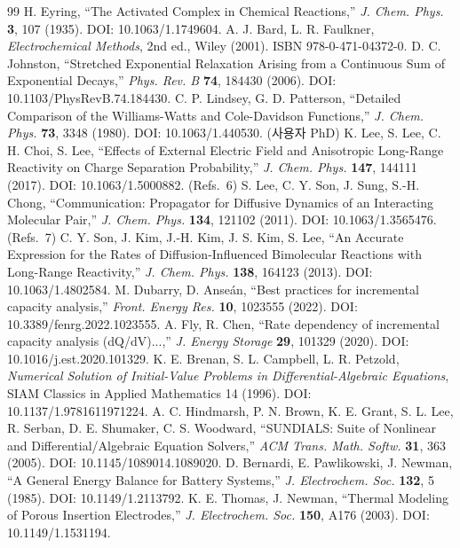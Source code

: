 \documentclass[11pt,a4paper]{article}
\newcommand{\brk}{\discretionary{}{}{}}%
\begin{document}
\begin{thebibliography}{99}
 H. Eyring, ``The Activated Complex in Chemical Reactions,'' \emph{J. Chem. Phys.}
  \textbf{3}, 107 (1935). DOI: 10.1063/1.1749604.
 A. J. Bard, L. R. Faulkner, \emph{Electrochemical Methods}, 2nd ed., Wiley (2001).
  ISBN 978-0-471-04372-0.
 D. C. Johnston, ``Stretched Exponential Relaxation Arising from a Continuous Sum
  of Exponential Decays,'' \emph{Phys. Rev. B} \textbf{74}, 184430 (2006). DOI: 10.1103/PhysRevB.74.184430.
 C. P. Lindsey, G. D. Patterson, ``Detailed Comparison of the Williams-Watts and
  Cole-Davidson Functions,'' \emph{J. Chem. Phys.} \textbf{73}, 3348 (1980). DOI: 10.1063/1.440530.
 (사용자 PhD) K. Lee, S. Lee, C. H. Choi, S. Lee, ``Effects of External Electric Field and Anisotropic Long-Range Reactivity on Charge Separation Probability,''
  \emph{J. Chem. Phys.} \textbf{147}, 144111 (2017). DOI: 10.1063/1.5000882.
 (Refs.~6) S. Lee, C. Y. Son, J. Sung, S.-H. Chong, ``Communication: Propagator for Diffusive Dynamics of an Interacting Molecular Pair,''
  \emph{J. Chem. Phys.} \textbf{134}, 121102 (2011). DOI: 10.1063/1.3565476.
 (Refs.~7) C. Y. Son, J. Kim, J.-H. Kim, J. S. Kim, S. Lee, ``An Accurate Expression for the Rates of Diffusion-Influenced Bimolecular Reactions with Long-Range Reactivity,''
  \emph{J. Chem. Phys.} \textbf{138}, 164123 (2013). DOI: 10.1063/1.4802584.
 M. Dubarry, D. Anseán, ``Best practices for incremental capacity analysis,''
  \emph{Front. Energy Res.} \textbf{10}, 1023555 (2022). DOI: 10.3389/fenrg.2022.1023555.
 A. Fly, R. Chen, ``Rate dependency of incremental capacity analysis (dQ/dV)...,''
  \emph{J. Energy Storage} \textbf{29}, 101329 (2020). DOI: 10.1016/j.est.2020.101329.
 K. E. Brenan, S. L. Campbell, L. R. Petzold, \emph{Numerical Solution of Initial-Value
  Problems in Differential-Algebraic Equations}, SIAM Classics in Applied Mathematics 14 (1996).
  DOI: 10.1137/\brk 1.9781611971224.
 A. C. Hindmarsh, P. N. Brown, K. E. Grant, S. L. Lee, R. Serban, D. E. Shumaker,
  C. S. Woodward, ``SUNDIALS: Suite of Nonlinear and Differential/Algebraic Equation Solvers,''
  \emph{ACM Trans. Math. Softw.} \textbf{31}, 363 (2005). DOI: 10.1145/\brk 1089014.1089020.
 D. Bernardi, E. Pawlikowski, J. Newman, ``A General Energy Balance for Battery
  Systems,'' \emph{J. Electrochem. Soc.} \textbf{132}, 5 (1985). DOI: 10.1149/\brk 1.2113792.
 K. E. Thomas, J. Newman, ``Thermal Modeling of Porous Insertion Electrodes,''
  \emph{J. Electrochem. Soc.} \textbf{150}, A176 (2003). DOI: 10.1149/\brk 1.1531194.
\end{thebibliography}
\end{document}
